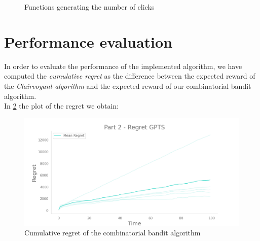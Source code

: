 \begin{figure}[!htb]
    \caption{Functions generating the number of clicks}
    \label{curve2Fig}
\end{figure}


\section{Performance evaluation}
In order to evaluate the performance of the implemented algorithm, we have computed the \emph{cumulative regret} as the difference between the expected reward of the \textit{Clairvoyant algorithm} and the expected reward of our combinatorial bandit algorithm.\\
In \ref{regret2Fig} the plot of the regret we obtain:
\begin{figure}[!htb]
    \centering
    \includegraphics[width=\textwidth]{images/part2.png}
    \caption{Cumulative regret of the combinatorial bandit algorithm}
    \label{regret2Fig}
\end{figure}


